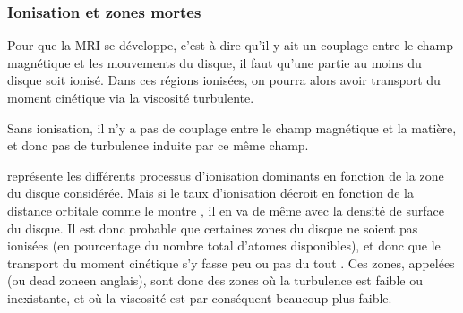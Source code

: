 \subsubsection{Ionisation et zones mortes}\label{sec:ionisation_DZ}
Pour que la MRI se développe, c'est-à-dire qu'il y ait un couplage entre le champ magnétique et les mouvements du disque, il faut qu'une partie au moins du disque soit ionisé. Dans ces régions ionisées, on pourra alors avoir transport du moment cinétique via la viscosité turbulente. 

\bigskip

Sans ionisation, il n'y a pas de couplage entre le champ magnétique et la matière, et donc pas de turbulence induite par ce même champ. 

 représente les différents processus d'ionisation dominants en fonction de la zone du disque considérée.
Mais si le taux d'ionisation décroit en fonction de la distance orbitale \citep{ilgner2006ionisation1} comme le montre
, il en va de même avec la densité de surface du disque. Il est donc probable que certaines zones
du disque ne soient pas ionisées (en pourcentage du nombre total d'atomes disponibles), et donc que le transport du moment
cinétique s'y fasse peu ou pas du tout \citep{gammie1996layered}. Ces zones, appelées  (ou \og dead zone\fg en anglais), sont donc des zones où
la turbulence est faible ou inexistante, et où la viscosité est par conséquent beaucoup plus faible. 

